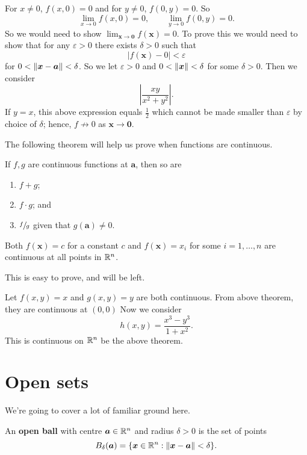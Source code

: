 
\begin{solution}
    For $x \neq 0$, $f(x, 0) = 0$ and for $y \neq 0$, $f(0, y) = 0$. So
    \[ \lim_{x \to 0} f(x, 0) = 0, \qquad \lim_{y \to 0} f(0, y) = 0. \]
    So we would need to show 
    $\lim_{\bm x \to \bm 0} f(\bm x) = 0$. 
    To prove this we would need to show that for any $\varepsilon > 0$ there exists $\delta > 0$ such that
    \[ \lvert f(\bm x) - 0 \rvert < \varepsilon \]
    for $0 < \left\lVert\bm x - \bm a\right\rVert < \delta$. 
    So we let $\varepsilon > 0$ and $0 < \left\lVert\bm x\right\rVert < \delta$ for some $\delta > 0$. 
    Then we consider
    \[ \left\lvert \frac{xy}{x^2 + y^2} \right\rvert. \]
    If $y = x$, this above expression equals $\frac12$ which cannot be made smaller than $\varepsilon$ by choice of $\delta$; hence, $f \not \to 0$ as $\bm x \to \bm 0$.
\end{solution}

The following theorem will help us prove when functions are continuous.

\begin{theorem}[]
    If $f, g$ are continuous functions at $\bm a$, then so are
    \begin{enumerate}
        \item $f + g$;
        \item $f \cdot g$; and
        \item $\sfrac fg$ given that $g(\bm a) \neq 0$.
    \end{enumerate}
    Both $f(\bm x) = c$ for a constant $c$ and $f(\bm x) = x_i$ for some $i = 1,\ldots,n$ are continuous at all points in $\mathbb{R}^n$.
\end{theorem}

This is easy to prove, and will be left.

\begin{example}
    Let $f(x, y) = x$ and $g(x, y) = y$ are both continuous. 
    From above theorem, they are continuous at $(0,0)$ Now we consider 
    \[ h(x, y) = \frac{x^3 - y^3}{1 + x^2}. \]
    This is continuous on $\mathbb{R}^n$ be the above theorem.
\end{example}

\section{Open sets}

We're going to cover a lot of familiar ground here.

\begin{definition}
    An \textbf{open ball} with centre $\bm a \in \mathbb{R}^n$ and radius $\delta > 0$ is the set of points
    \[ B_\delta(\bm a) = \{ \bm x \in \mathbb{R}^n: \left\lVert\bm x - \bm a\right\rVert < \delta \}. \]
\end{definition}

